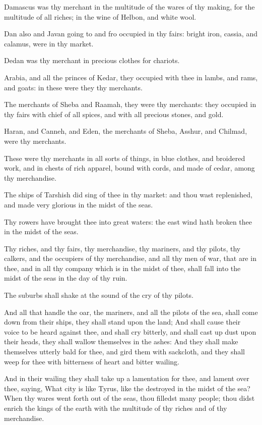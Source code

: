 \Verse Damascus was thy merchant in the multitude of the wares of thy making, for the multitude of all riches; in the wine of Helbon, and white wool.

\Verse Dan also and Javan going to and fro occupied in thy fairs: bright iron, cassia, and calamus, were in thy market.

\Verse Dedan was thy merchant in precious clothes for chariots.

\Verse Arabia, and all the princes of Kedar, they occupied with thee in lambs, and rams, and goats: in these were they thy merchants.

\Verse The merchants of Sheba and Raamah, they were thy merchants: they occupied in thy fairs with chief of all spices, and with all precious stones, and gold.

\Verse Haran, and Canneh, and Eden, the merchants of Sheba, Asshur, and Chilmad, were thy merchants.

\Verse These were thy merchants in all sorts of things, in blue clothes, and broidered work, and in chests of rich apparel, bound with cords, and made of cedar, among thy merchandise.

\Verse The ships of Tarshish did sing of thee in thy market: and thou wast replenished, and made very glorious in the midst of the seas.

\Verse Thy rowers have brought thee into great waters: the east wind hath broken thee in the midst of the seas.

\Verse Thy riches, and thy fairs, thy merchandise, thy mariners, and thy pilots, thy calkers, and the occupiers of thy merchandise, and all thy men of war, that are in thee, and in all thy company which is in the midst of thee, shall fall into the midst of the seas in the day of thy ruin.

\Verse The suburbs shall shake at the sound of the cry of thy pilots.

\Verse And all that handle the oar, the mariners, and all the pilots of the sea, shall come down from their ships, they shall stand upon the land; \Verse And shall cause their voice to be heard against thee, and shall cry bitterly, and shall cast up dust upon their heads, they shall wallow themselves in the ashes: \Verse And they shall make themselves utterly bald for thee, and gird them with sackcloth, and they shall weep for thee with bitterness of heart and bitter wailing.

\Verse And in their wailing they shall take up a lamentation for thee, and lament over thee, saying, What city is like Tyrus, like the destroyed in the midst of the sea?  \Verse When thy wares went forth out of the seas, thou filledst many people; thou didst enrich the kings of the earth with the multitude of thy riches and of thy merchandise.

